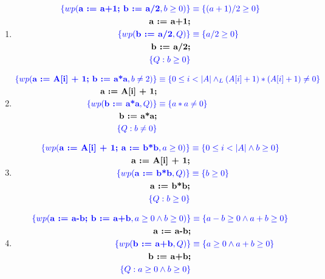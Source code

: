 \documentclass{article}
\begin{document}
\begin{enumerate}[label=\alph*)]
	\item
		
		\begin{align*}
		\color{blue}\{wp(\textbf{a := a+1; b := a/2}, b \geq 0)\} &\color{blue}
			\equiv \{(a+1)/2\geq 0\}\\
		\textbf{a := a+1;}\\
		\color{blue}\{wp(\textbf{b := a/2},Q)\}&\color{blue}\equiv \{a/2\geq 0\}\\
		\textbf{b := a/2;}\\
		\color{blue}\{Q:b \geq 0\}
		\end{align*}
		
	\item
		\begin{align*}
		\color{blue}\{wp(\textbf{a := A[i] + 1; b := a*a}, b\neq 2)\} &\color{blue}
			\equiv \{0\leq i<|A|\wedge_L (A[i] + 1)*(A[i] + 1)\neq 0\}\\
		\textbf{a := A[i] + 1;}\\
		\color{blue}\{wp(\textbf{b := a*a},Q)\}&\color{blue}\equiv \{a*a\neq 0\}\\
		\textbf{b := a*a;}\\
		\color{blue}\{Q:b \neq 0\}
		\end{align*}
	\item
		\begin{align*}
		\color{blue}\{wp(\textbf{a := A[i] + 1; a := b*b}, a \geq 0)\} &\color{blue}
			\equiv \{0\leq i<|A|\wedge b\geq 0\}\\
		\textbf{a := A[i] + 1;}\\
		\color{blue}\{wp(\textbf{a := b*b},Q)\}&\color{blue}\equiv \{b\geq 0\}\\
		\textbf{a := b*b;}\\
		\color{blue}\{Q:b \geq 0\}
		\end{align*}
	\item
		\begin{align*}
		\color{blue}\{wp(\textbf{a := a-b; b := a+b}, a \geq 0 \wedge b \geq 0)\} &\color{blue}
			\equiv \{a-b \geq 0 \wedge a+b \geq 0\}\\
		\textbf{a := a-b;}\\
		\color{blue}\{wp(\textbf{b := a+b},Q)\}&\color{blue}
			\equiv \{a \geq 0 \wedge a+b \geq 0\}\\
		\textbf{b := a+b;}\\
		\color{blue}\{Q:a \geq 0 \wedge b \geq 0\}
		\end{align*}
\end{enumerate}
\end{document}
